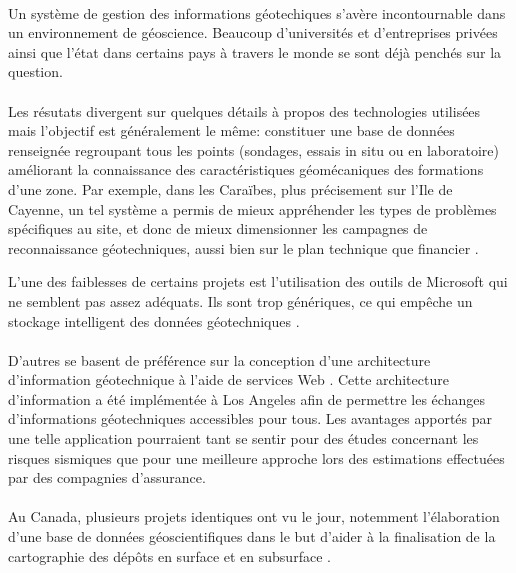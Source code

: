 \paragraph{}
Un système de gestion des informations géotechiques s'avère incontournable
dans un environnement de géoscience. Beaucoup d'universités et d'entreprises 
privées ainsi que l'état dans certains pays à travers le monde se sont déjà 
penchés sur la question. 
\paragraph{}
Les résutats divergent sur quelques détails à propos des technologies utilisées mais 
l'objectif est généralement le même: 
constituer une base de données renseignée regroupant tous les points (sondages, essais
in situ ou en laboratoire) améliorant la connaissance des caractéristiques géomécaniques des
formations d'une zone.
Par exemple, dans les Caraïbes, plus précisement sur l'Ile de Cayenne, un tel système a permis
de mieux appréhender les types de problèmes
spécifiques au site, et donc de mieux dimensionner les campagnes de reconnaissance
géotechniques, aussi bien sur le plan technique que financier
\cite{cayenne}.
\par 
L'une des faiblesses de certains projets est l'utilisation des outils de Microsoft
qui ne semblent pas assez 
adéquats. Ils sont trop génériques, ce qui empêche un stockage intelligent des données géotechniques
\cite{antoljak2012subsurface}.


\paragraph{}D'autres se basent de préférence sur la conception d'une architecture d'information 
géotechnique à l'aide de services Web
\cite{zimmermann2003design}.
Cette architecture d'information a été implémentée à Los Angeles afin de permettre les échanges 
d'informations géotechniques accessibles pour tous. Les avantages apportés par une telle 
application pourraient tant se sentir pour des études concernant les risques sismiques que pour 
une meilleure approche lors des estimations effectuées par des compagnies d'assurance. 

\paragraph{}
Au Canada, plusieurs projets identiques ont vu le jour, notemment l'élabora\-tion d'une base 
de données géoscientifiques dans le but d’aider à la finalisation de la 
cartographie des dépôts en surface et en subsurface
\cite{russell1996regional}.

